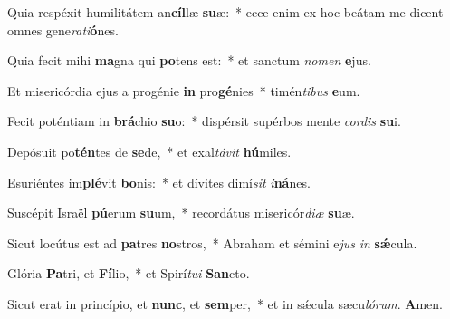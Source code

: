 ﻿\item Quia respéxit humilitátem an\textbf{cíl}læ \textbf{su}æ:~* ecce enim ex hoc beátam me dicent omnes gene\textit{ra}\textit{ti}\textbf{ó}nes.

\item Quia fecit mihi \textbf{ma}gna qui \textbf{po}tens est:~* et sanctum \textit{no}\textit{men} \textbf{e}jus.

\item Et misericórdia ejus a progénie \textbf{in} pro\textbf{gé}nies~* timén\textit{ti}\textit{bus} \textbf{e}um.

\item Fecit poténtiam in \textbf{brá}chio \textbf{su}o:~* dispérsit supérbos mente \textit{cor}\textit{dis} \textbf{su}i.

\item Depósuit po\textbf{tén}tes de \textbf{se}de,~* et exal\textit{tá}\textit{vit} \textbf{hú}miles.

\item Esuriéntes im\textbf{plé}vit \textbf{bo}nis:~* et dívites dimí\textit{sit} \textit{i}\textbf{ná}nes.

\item Suscépit Israël \textbf{pú}erum \textbf{su}um,~* recordátus misericór\textit{di}\textit{æ} \textbf{su}æ.

\item Sicut locútus est ad \textbf{pa}tres \textbf{no}stros,~* Abraham et sémini e\textit{jus} \textit{in} \textbf{sǽ}cula.

\item Glória \textbf{Pa}tri, et \textbf{Fí}lio,~* et Spirí\textit{tu}\textit{i} \textbf{San}cto.

\item Sicut erat in princípio, et \textbf{nunc}, et \textbf{sem}per,~* et in sǽcula sæcu\textit{ló}\textit{rum}. \textbf{A}men.